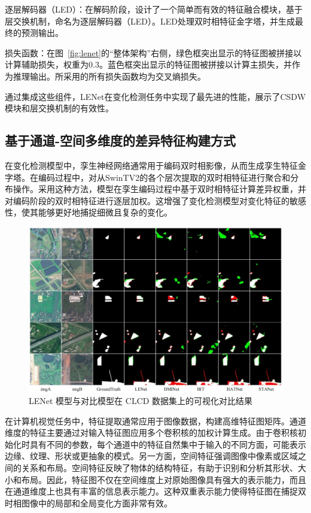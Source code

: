 逐层解码器（LED）：在解码阶段，设计了一个简单而有效的特征融合模块，基于层交换机制，命名为逐层解码器（LED）。LED处理双时相特征金字塔，并生成最终的预测输出。

损失函数：在图~\ref{fig:lenet}的“整体架构”右侧，绿色框突出显示的特征图被拼接以计算辅助损失，权重为0.3。蓝色框突出显示的特征图被拼接以计算主损失，并作为推理输出。所采用的所有损失函数均为交叉熵损失。

通过集成这些组件，LENet在变化检测任务中实现了最先进的性能，展示了CSDW模块和层交换机制的有效性。

\subsection{基于通道-空间多维度的差异特征构建方式}
在变化检测模型中，孪生神经网络通常用于编码双时相影像，从而生成孪生特征金字塔。在编码过程中，对从SwinTV2的各个层次提取的双时相特征进行聚合和分布操作。采用这种方法，模型在孪生编码过程中基于双时相特征计算差异权重，并对编码阶段的双时相特征进行逐层加权。这增强了变化检测模型对变化特征的敏感性，使其能够更好地捕捉细微且复杂的变化。

\begin{figure}[!htbp]
  \centering
  \includegraphics[width=\textwidth]{paper_figures/基于双时相遥感影像特征交互的变化检测算法研究/LENet/lenet_clcd.png}
  \caption{LENet 模型与对比模型在 CLCD 数据集上的可视化对比结果}
  \label{fig:lenet_clcd}
\end{figure}

在计算机视觉任务中，特征提取通常应用于图像数据，构建高维特征图矩阵。通道维度的特征主要通过对输入特征图应用多个卷积核的加权计算生成。由于卷积核初始化时具有不同的参数，每个通道中的特征自然集中于输入的不同方面，可能表示边缘、纹理、形状或更抽象的模式。另一方面，空间特征强调图像中像素或区域之间的关系和布局。空间特征反映了物体的结构特征，有助于识别和分析其形状、大小和布局。因此，特征图不仅在空间维度上对原始图像具有强大的表示能力，而且在通道维度上也具有丰富的信息表示能力。这种双重表示能力使得特征图在捕捉双时相图像中的局部和全局变化方面非常有效。

